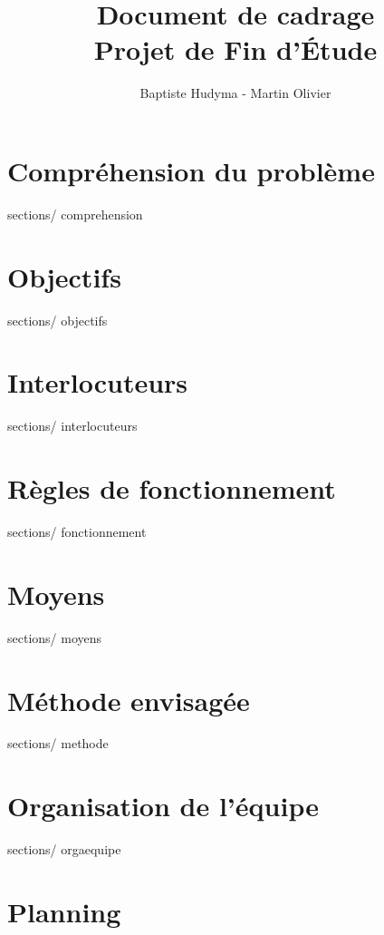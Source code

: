 \documentclass[french, 11pt, a4paper]{article}
\begin{document}
\title {Document de cadrage\\Projet de Fin d'Étude}
\author{Baptiste Hudyma - Martin Olivier}

\thispagestyle {plain}

\maketitle
\newpage

\tableofcontents
\newpage

\section {Compréhension du problème}
 {sections/} {comprehension}
\newpage

\section {Objectifs}
 {sections/} {objectifs}
\newpage

\section {Interlocuteurs}
 {sections/} {interlocuteurs}
\newpage

\section {Règles de fonctionnement}
 {sections/} {fonctionnement}
\newpage

\section {Moyens}
 {sections/} {moyens}
\newpage

\section {Méthode envisagée}
 {sections/} {methode}
\newpage

\section {Organisation de l'équipe}
 {sections/} {orgaequipe}
\newpage

\section {Planning}

\newpage
\end{document}
